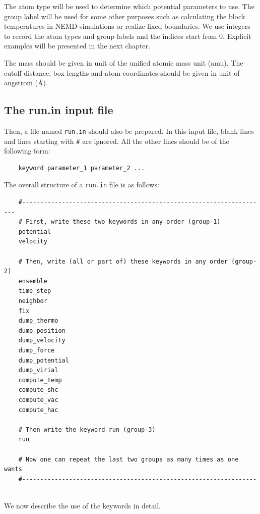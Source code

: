 \documentclass[12pt,a4paper]{report}
\begin{document}
The atom type will be used to determine which potential parameters to use. The group label will be used for some other purposes such as calculating the block temperatures in NEMD simulations or realize fixed boundaries. We use integers to record the atom types and group labels and the indices start from 0. Explicit examples will be presented in the next chapter.

The mass should be given in unit of the unified atomic mass unit (amu). The cutoff distance, box lengths and atom coordinates should be given in unit of angstrom (\AA).


\subsection{The run.in input file}

Then, a file named \verb"run.in" should also be prepared. In this input file, blank lines and lines starting with \verb"#" are ignored. All the other lines should be of the following form:
\begin{verbatim}
    keyword parameter_1 parameter_2 ...
\end{verbatim}
The overall structure of a \verb"run.in" file is as follows:
\begin{verbatim}
    #--------------------------------------------------------------------
    # First, write these two keywords in any order (group-1)
    potential
    velocity

    # Then, write (all or part of) these keywords in any order (group-2)
    ensemble
    time_step
    neighbor
    fix
    dump_thermo
    dump_position
    dump_velocity
    dump_force
    dump_potential
    dump_virial
    compute_temp
    compute_shc
    compute_vac
    compute_hac

    # Then write the keyword run (group-3)
    run

    # Now one can repeat the last two groups as many times as one wants
    #--------------------------------------------------------------------
\end{verbatim}
We now describe the use of the keywords in detail.
\end{document}
